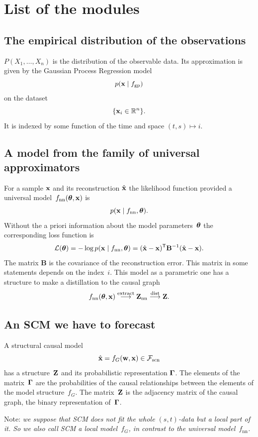 \documentclass[12pt]{article}
\begin{document}
\vspace{5cm}
\section*{List of the modules}
\subsection*{The empirical distribution of the observations}
$P(X_1,\dots,X_n)$ is the distribution of the observable data.
Its approximation is given by the Gaussian Process Regression model
\[
p(\mathbf{x} \mid f_\text{gp})
\]
on the dataset~
\[\{\mathbf{x}_i\in\mathbb{R}^n\}.\]
It is indexed by some function of the time and space $(t,s)\mapsto i$.

\subsection*{A model from the family of universal approximators}
For a sample $\mathbf{x}$ and its reconstruction $\hat{\mathbf{x}}$ the likelihood function provided a universal model~$f_\text{nn}({\boldsymbol{\theta}},\mathbf{x})$ is
\[p(\mathbf{x}\mid f_\text{nn}, {\boldsymbol{\theta}}).\]
Without the a priori information about the model parameters~${\boldsymbol{\theta}}$ the corresponding loss function is
\[
\loss(\bth) = -\log p(\bx\mid f_\text{nn}, \bth) = (\hat{\bx} - \bx)\T \mathbf{B}^{-1}(\hat{\bx} - \bx).%
    \]
The matrix $\mathbf{B}$ is the covariance of the reconstruction error.
This matrix in some statements depends on the index~$i$.
This model as a parametric one has a structure to make a distillation to the causal graph
\[
f_\text{nn}({\boldsymbol{\theta}}, \mathbf{x})  \overset{\text{extract}}{\longrightarrow} \mathbf{Z}_\text{nn} \overset{\text{dist}}{\longrightarrow}  \mathbf{Z}.
\]

\subsection*{An SCM we have to forecast}
A structural causal model
\[
    \hat{\mathbf{x}} = f_G(\mathbf{w},\mathbf{x}) \in\mathcal{F}_\text{scn}
\]
has a structure~$\mathbf{Z}$ and its probabilistic representation ${\boldsymbol{\Gamma}}$.
The elements of the matrix~${\boldsymbol{\Gamma}}$ are the probabilities of the causal relationships between the elements of the model structure~$f_G$.
The matrix~$\mathbf{Z}$ is the adjacency matrix of the causal graph, the binary representation of~${\boldsymbol{\Gamma}}$.

\medskip
Note: \emph{we suppose that SCM does not fit the whole $(s,t)$-data but a local part of it.
So we also call SCM a local model~$f_G$, in contrast to the universal model~$f_\text{nn}$.}
\end{document}
